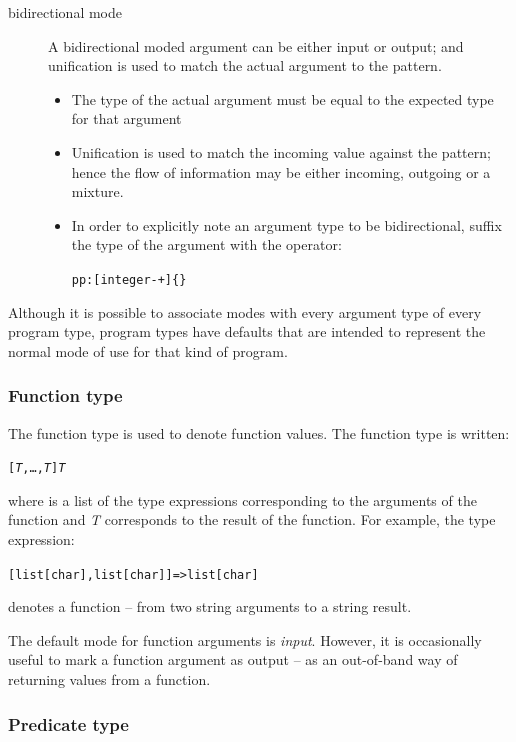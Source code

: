 \begin{description}
\item[bidirectional mode]
A bidirectional moded argument can be either input or output; and unification is used to match the actual argument to the pattern.
\begin{itemize}
\item
The type of the actual argument must be equal to the expected type for that argument
\item
Unification is used to match the incoming value against the pattern; hence the flow of information may be either incoming, outgoing or a mixture.
\item
In order to explicitly note an argument type to be bidirectional, suffix the type of the argument with the \q{-+} operator:
\begin{alltt}
pp:[integer-+]\{\}
\end{alltt}
\end{itemize}
\end{description}

Although it is possible to associate modes with every argument type of every program type, program types have defaults that are intended to represent the normal mode of use for that kind of program.

\subsubsection{Function type}
\label{types:standard:function}

The function type is used to denote function values. The function type is written:
\begin{alltt}
[\emph{T},\ldots,\emph{T}] \funarrow{} \emph{T}
\end{alltt}
where  is a list of the type expressions corresponding to the arguments of the function and \emph{T} corresponds to the result of the function. For example, the type expression:
\begin{alltt}
[list[char],list[char]]=>list[char]
\end{alltt}
denotes a function -- from two string arguments to a string result.

The default mode for function arguments is \emph{input}. However, it is occasionally useful to mark a function argument as output -- as an out-of-band way of returning values from a function.

\subsubsection{Predicate type}
\label{types:standard:predicate}

